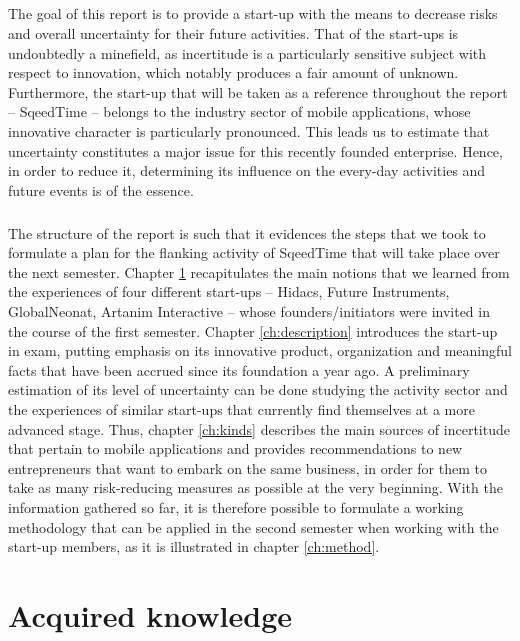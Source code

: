 \documentclass[twoside]{report}
\begin{document}
\paragraph{}
The goal of this report is to provide a start-up with the means to decrease risks and overall uncertainty for their future activities. That of the start-ups is undoubtedly a minefield, as incertitude is a particularly sensitive subject with respect to innovation, which notably produces a fair amount of unknown. Furthermore, the start-up that will be taken as a reference throughout the report – SqeedTime – belongs to the industry sector of mobile applications, whose innovative character is particularly pronounced. This leads us to estimate that uncertainty constitutes a major issue for this recently founded enterprise. Hence, in order to reduce it, determining its influence on the every-day activities and future events is of the essence.
\paragraph{}
The structure of the report is such that it evidences the steps that we took to formulate a plan for the flanking activity of SqeedTime that will take place over the next semester. Chapter \ref{ch:knowledge} recapitulates the main notions that we learned from the experiences of four different start-ups – Hidacs, Future Instruments, GlobalNeonat, Artanim Interactive – whose founders/initiators were invited in the course of the first semester. Chapter \ref{ch:description} introduces the start-up in exam, putting emphasis on its innovative product, organization and meaningful facts that have been accrued since its foundation a year ago. A preliminary estimation of its level of uncertainty can be done studying the activity sector and the experiences of similar start-ups that currently find themselves at a more advanced stage. Thus, chapter \ref{ch:kinds} describes the main sources of incertitude that pertain to mobile applications and provides recommendations to new entrepreneurs that want to embark on the same business, in order for them to take as many risk-reducing measures as possible at the very beginning. With the information gathered so far, it is therefore possible to formulate a working methodology that can be applied in the second semester when working with the start-up members, as it is illustrated in chapter \ref{ch:method}. 
\chapter{Acquired knowledge}
\label{ch:knowledge}
\end{document}
